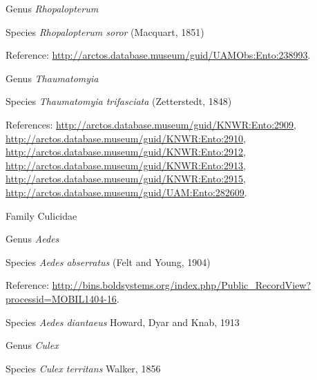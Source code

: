 \documentclass[9pt, article]{memoir}
\begin{document}
\begin{multicols}{2}
\vspace{6pt}\noindent\hspace{30pt}Genus \textit{Rhopalopterum}


\vspace{6pt}\noindent\hspace{36pt}Species \textit{Rhopalopterum soror} (Macquart, 1851)


\vspace{6pt}Reference: 
\url{http://arctos.database.museum/guid/UAMObs:Ento:238993}.

\vspace{6pt}\noindent\hspace{30pt}Genus \textit{Thaumatomyia}


\vspace{6pt}\noindent\hspace{36pt}Species \textit{Thaumatomyia trifasciata} (Zetterstedt, 1848)


\vspace{6pt}References: 
\url{http://arctos.database.museum/guid/KNWR:Ento:2909}, 
\url{http://arctos.database.museum/guid/KNWR:Ento:2910}, 
\url{http://arctos.database.museum/guid/KNWR:Ento:2912}, 
\url{http://arctos.database.museum/guid/KNWR:Ento:2913}, 
\url{http://arctos.database.museum/guid/KNWR:Ento:2915}, 
\url{http://arctos.database.museum/guid/UAM:Ento:282609}.

\vspace{6pt}\noindent\hspace{24pt}Family Culicidae


\vspace{6pt}\noindent\hspace{30pt}Genus \textit{Aedes}


\vspace{6pt}\noindent\hspace{36pt}Species \textit{Aedes abserratus} (Felt and Young, 1904)


\vspace{6pt}Reference: 
\url{http://bins.boldsystems.org/index.php/Public_RecordView?processid=MOBIL1404-16}.

\vspace{6pt}\noindent\hspace{36pt}Species \textit{Aedes diantaeus} Howard, Dyar and Knab, 1913


\vspace{6pt}\noindent\hspace{30pt}Genus \textit{Culex}


\vspace{6pt}\noindent\hspace{36pt}Species \textit{Culex territans} Walker, 1856



\end{multicols}
\end{document}
